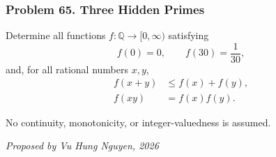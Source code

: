 \subsubsection*{Problem 65. Three Hidden Primes}

\begin{exercisebox}[hard]

Determine all functions $f:\mathbb Q\to[0,\infty)$ satisfying
\[
f(0)=0,\qquad f(30)=\frac1{30},
\]
and, for all rational numbers $x,y$,
\[
\boxed{
\begin{aligned}
f(x+y)&\le f(x)+f(y),\\
f(xy)&=f(x)f(y).
\end{aligned}}
\]

No continuity, monotonicity, or integer-valuedness is assumed.

\begin{flushright}
\textit{Proposed by Vu Hung Nguyen, 2026}
\end{flushright}


\end{exercisebox}

